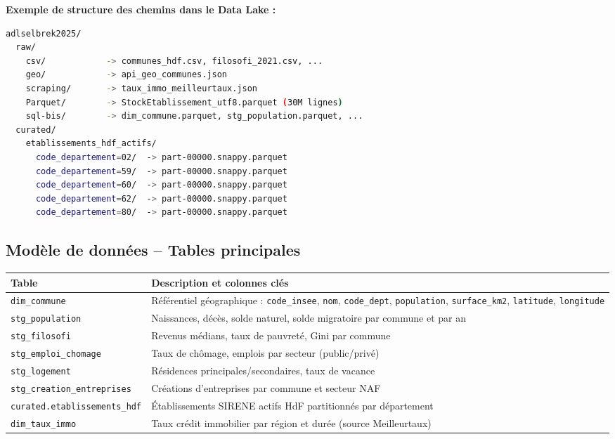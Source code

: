 \documentclass[11pt,a4paper]{article}
\begin{document}
\textbf{Exemple de structure des chemins dans le Data Lake :}
\begin{lstlisting}[language=bash, caption=Organisation des fichiers dans l'ADLS Gen2]
adlselbrek2025/
  raw/
    csv/            -> communes_hdf.csv, filosofi_2021.csv, ...
    geo/            -> api_geo_communes.json
    scraping/       -> taux_immo_meilleurtaux.json
    Parquet/        -> StockEtablissement_utf8.parquet (30M lignes)
    sql-bis/        -> dim_commune.parquet, stg_population.parquet, ...
  curated/
    etablissements_hdf_actifs/
      code_departement=02/  -> part-00000.snappy.parquet
      code_departement=59/  -> part-00000.snappy.parquet
      code_departement=60/  -> part-00000.snappy.parquet
      code_departement=62/  -> part-00000.snappy.parquet
      code_departement=80/  -> part-00000.snappy.parquet
\end{lstlisting}

\subsection{Modèle de données -- Tables principales}

\begin{tabular}{L{3.5cm} L{10cm}}
  \toprule
  \textbf{Table} & \textbf{Description et colonnes clés} \\
  \midrule
  \texttt{dim\_commune} & Référentiel géographique : \texttt{code\_insee}, \texttt{nom}, \texttt{code\_dept}, \texttt{population}, \texttt{surface\_km2}, \texttt{latitude}, \texttt{longitude} \\[0.4em]
  \texttt{stg\_population} & Naissances, décès, solde naturel, solde migratoire par commune et par an \\[0.4em]
  \texttt{stg\_filosofi} & Revenus médians, taux de pauvreté, Gini par commune \\[0.4em]
  \texttt{stg\_emploi\_chomage} & Taux de chômage, emplois par secteur (public/privé) \\[0.4em]
  \texttt{stg\_logement} & Résidences principales/secondaires, taux de vacance \\[0.4em]
  \texttt{stg\_creation\_entreprises} & Créations d'entreprises par commune et secteur NAF \\[0.4em]
  \texttt{curated.etablissements\_hdf} & Établissements SIRENE actifs HdF partitionnés par département \\[0.4em]
  \texttt{dim\_taux\_immo} & Taux crédit immobilier par région et durée (source Meilleurtaux) \\
  \bottomrule
\end{tabular}
\end{document}
